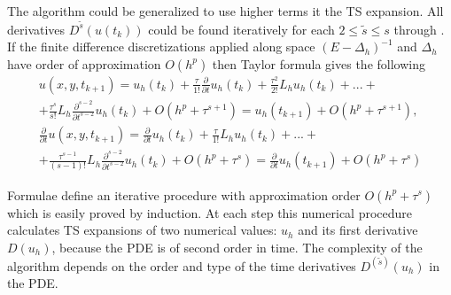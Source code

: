 \documentclass[11pt,a4paper,twoside]{article}
\begin{document}
The algorithm could be generalized to use higher terms it the TS expansion. All derivatives $D^{\tilde s}(u(t_k))$ could be found iteratively for each $2 \leq \tilde s \leq s$ through . If the finite difference discretizations applied along space $(E - \Delta_h)^{-1}$ and $\Delta_h$ have order of approximation $O(h^p)$ then Taylor formula gives the following
\begin{align} \label{GeneralIt}
u(x,y,t_{k+1}) = u_h(t_k) + \frac{\tau } {1!}  \frac{\partial}{\partial t} u_h(t_k) + \frac{ \tau^2} { 2!}L_h u_h(t_k) +... + \nonumber
\\ + \frac{\tau^s}{ s! }L_h \frac{\partial^{s-2}}{\partial t^{s-2}} u_h(t_k) + O(h^p + \tau^{s+1}) = u_h(t_{k+1}) + O(h^p + \tau^{s+1}), \nonumber
\\  \frac{\partial}{\partial t}u(x,y,t_{k+1}) = \frac{\partial}{\partial t} u_h(t_k) + \frac{\tau } {1!}  L_h u_h(t_k) + ... + \nonumber
\\ + \frac{\tau^{s-1}}{ (s-1)! } L_h \frac{\partial^{s-2} }{\partial t^{s-2}} u_h(t_k)  + O(h^p + \tau^s) = \frac{\partial}{\partial t}u_h(t_{k+1}) + O(h^p + \tau^s)
\end{align}

Formulae  define an iterative procedure with approximation order $O(h^p + \tau^s)$ which is easily proved by induction. At each step this numerical procedure calculates TS expansions of two numerical values: $u_h$ and its first derivative $D(u_h)$, because the PDE is of second order in time. The complexity of the algorithm depends on the order and type of the time derivatives $D^{(\tilde s)}(u_h)$ in the PDE.


\end{document}

